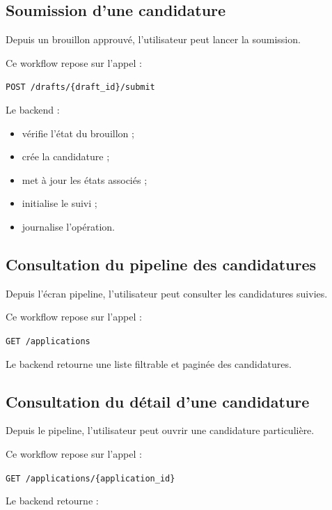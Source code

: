 \documentclass[11pt,a4paper]{article}
\begin{document}
\subsection{Soumission d’une candidature}

Depuis un brouillon approuvé, l’utilisateur peut lancer la soumission.

Ce workflow repose sur l’appel :

\begin{center}
\texttt{POST /drafts/\{draft\_id\}/submit}
\end{center}

Le backend :

\begin{itemize}
    \item vérifie l’état du brouillon ;
    \item crée la candidature ;
    \item met à jour les états associés ;
    \item initialise le suivi ;
    \item journalise l’opération.
\end{itemize}

\subsection{Consultation du pipeline des candidatures}

Depuis l’écran pipeline, l’utilisateur peut consulter les candidatures suivies.

Ce workflow repose sur l’appel :

\begin{center}
\texttt{GET /applications}
\end{center}

Le backend retourne une liste filtrable et paginée des candidatures.

\subsection{Consultation du détail d’une candidature}

Depuis le pipeline, l’utilisateur peut ouvrir une candidature particulière.

Ce workflow repose sur l’appel :

\begin{center}
\texttt{GET /applications/\{application\_id\}}
\end{center}

Le backend retourne :
\end{document}
